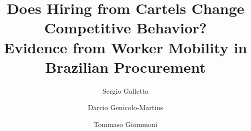 \documentclass[12pt]{elsarticle}
\begin{document}
\begin{frontmatter}

\title{\textbf{Does Hiring from Cartels Change Competitive Behavior?\\ Evidence from Worker Mobility in Brazilian Procurement}}

\author[ETH]{Sergio Galletta}
\author[INSPER]{Darcio Genicolo-Martins}
\author[UvA]{Tommaso Giommoni}
\address[ETH]{ETH Zürich}
\address[INSPER]{INSPER}
\address[UvA]{University of Amsterdam}

\begin{abstract}

\end{abstract}

\end{frontmatter}

\clearpage










\clearpage


\end{document}
